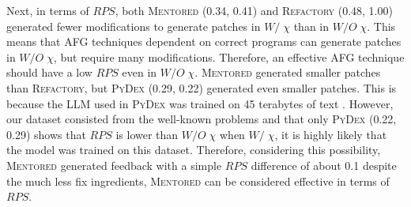 \documentclass[10pt,conference]{IEEEtran}
\begin{document}
        Next, in terms of $RPS$, both \textsc{Mentored} (0.34, 0.41) and \textsc{Refactory} (0.48, 1.00) generated fewer modifications to generate patches in $W/\;\chi$ than in $W/O\;\chi$. This means that AFG techniques dependent on correct programs can generate patches in $W/O\;\chi$, but require many modifications. Therefore, an effective AFG technique should have a low $RPS$ even in $W/O\;\chi$. \textsc{Mentored} generated smaller patches than \textsc{Refactory}, but \textsc{PyDex} (0.29, 0.22) generated even smaller patches. This is because the LLM used in \textsc{PyDex} was trained on 45 terabytes of text \cite{brown2020language}. However, our dataset consisted from the well-known problems and that only \textsc{PyDex} (0.22, 0.29) shows that $RPS$ is lower than $W/O\;\chi$ when $W/\;\chi$, it is highly likely that the model was trained on this dataset. Therefore, considering this possibility, \textsc{Mentored} generated feedback with a simple $RPS$ difference of about 0.1 despite the much less fix ingredients, \textsc{Mentored} can be considered effective in terms of $RPS$.
        
\end{document}

